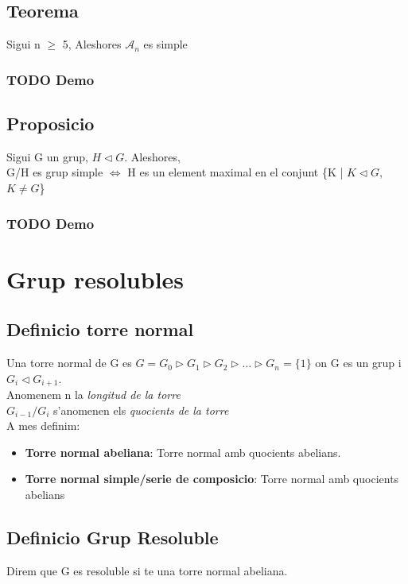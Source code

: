 \documentclass[11pt]{article}
\begin{document}
\subsection{Teorema}
\label{sec:orgd0998e6}
Sigui n \(\geq\) 5, Aleshores \(\mathcal{A}_n\) es simple
\subsubsection{{\bfseries\sffamily TODO} Demo}
\label{sec:org4f5d1fa}
\subsection{Proposicio}
\label{sec:orge768223}
    Sigui G un grup, \(H \vartriangleleft G\). Aleshores,\\
G/H es grup simple \(\iff\) H es un element maximal en el conjunt \{K | \(K \vartriangleleft G\), \(K \neq G\)\}
\subsubsection{{\bfseries\sffamily TODO} Demo}
\label{sec:orge5a1cd4}

\section{Grup resolubles}
\label{sec:org7b1e72a}

\subsection{Definicio torre normal}
\label{sec:orgfa53c2f}
Una torre normal de G es \(G = G_0 \vartriangleright G_1 \vartriangleright G_2 \vartriangleright \ldots \vartriangleright G_n = \{1\}\) on G es un grup i \(G_i \vartriangleleft G_{i+1}\). \\
Anomenem n la \emph{longitud de la torre} \\
\(G_{i-1}/G_i\) s'anomenen els \emph{quocients de la torre} \\

A mes definim:
\begin{itemize}
\item \textbf{Torre normal abeliana}: Torre normal amb quocients abelians.
\item \textbf{Torre normal simple/serie de composicio}: Torre normal amb quocients abelians
\end{itemize}

\subsection{Definicio Grup Resoluble}
\label{sec:orgb0a547c}
Direm que G es resoluble si te una torre normal abeliana.
\end{document}
